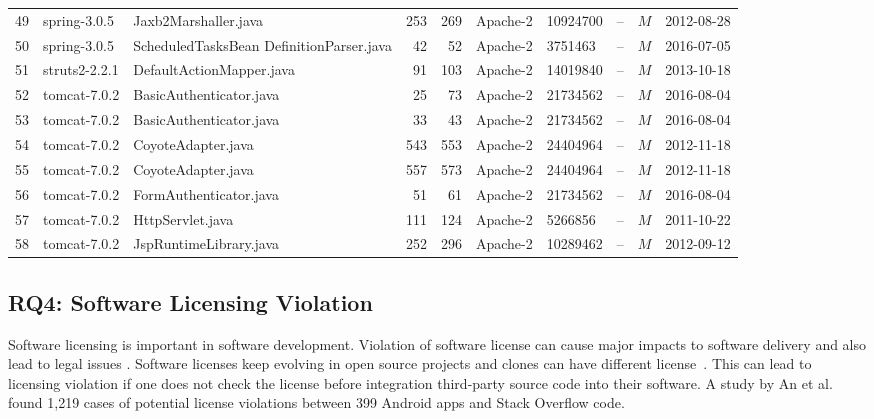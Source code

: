 \documentclass{sig-alternate-05-2015}
\begin{document}
\begin{table}
{\begin{tabular}{r|l|p{4.5cm}|r|r|l|l|l|c|l}
			49 & spring-3.0.5  & Jaxb2Marshaller.java  & 253 & 269 & Apache-2 & 10924700 & -- & $M$  & 2012-08-28 \\
			50 & spring-3.0.5  & ScheduledTasksBean \newline DefinitionParser.java  & 42 & 52 & Apache-2 & 3751463 & -- & $M$  & 2016-07-05 \\
			51 & struts2-2.2.1  & DefaultActionMapper.java  & 91 & 103 & Apache-2 & 14019840 & -- & $M$  & 2013-10-18 \\
			52 & tomcat-7.0.2  & BasicAuthenticator.java  & 25 & 73 & Apache-2 & 21734562 & -- & $M$  & 2016-08-04 \\
			53 & tomcat-7.0.2  & BasicAuthenticator.java  & 33 & 43 & Apache-2 & 21734562 & -- & $M$  & 2016-08-04 \\
			54 & tomcat-7.0.2  & CoyoteAdapter.java  & 543 & 553 & Apache-2 & 24404964 & -- & $M$  & 2012-11-18 \\
			55 & tomcat-7.0.2  & CoyoteAdapter.java  & 557 & 573 & Apache-2 & 24404964 & -- & $M$  & 2012-11-18 \\
			56 & tomcat-7.0.2  & FormAuthenticator.java  & 51 & 61 & Apache-2 & 21734562 & -- & $M$  & 2016-08-04 \\
			57 & tomcat-7.0.2  & HttpServlet.java  & 111 & 124 & Apache-2 & 5266856 & -- & $M$  & 2011-10-22 \\
			58 & tomcat-7.0.2  & JspRuntimeLibrary.java  & 252 & 296 & Apache-2 & 10289462 & -- & $M$  & 2012-09-12 \\
		\hline
	\end{tabular} %
}
\end{table}

\subsection{RQ4: Software Licensing Violation}
Software licensing is important in software development. Violation of software license can cause major impacts to software delivery and also lead to legal issues \cite{Sprigman2015}. 
Software licenses keep evolving in open source projects \cite{DiPenta2010} and clones can have different license~\cite{German2009}. This can lead to licensing violation if one does not check the license before integration third-party source code into their software. A study by An et al.~\cite{An2017} found 1,219 cases of potential license violations between 399 Android apps and Stack Overflow code. %
\end{document}
